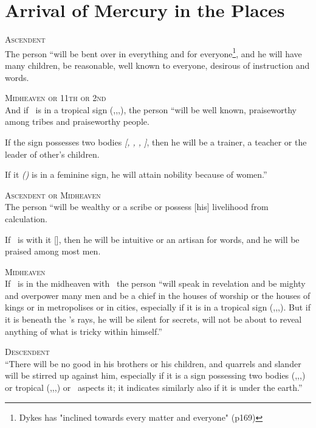 \section{Arrival of Mercury in the Places}

\noindent\textsc{Ascendent} \hfill \\
\indent The person ``will be bent over in  everything and for everyone\footnote{Dykes has "inclined towards every matter and everyone" (p169)}, and he will have many children, be reasonable, well known to everyone, desirous of instruction and words.

\noindent\textsc{Midheaven or 11th or 2nd} \hfill \\
\indent And if \Mercury\, is in a tropical sign (\Aries,\Cancer,\Libra,\Capricorn), the person ``will be well known, praiseworthy among tribes and praiseworthy people. 

If the sign possesses two bodies \textsl{[\Gemini, \Virgo, \Sagittarius, \Pisces]}, then he will be a trainer, a teacher or the leader of other's children.

If it \textsl{(\Mercury)} is in a feminine sign, he will attain nobility because of women.''

\noindent\textsc{Ascendent or Midheaven} \hfill \\
\indent The person ``will be wealthy or a scribe or possess [his] livelihood from calculation.

If \Venus\, is with it [\Mercury], then he will be intuitive or an artisan for words, and he will be praised among most men.

\noindent\textsc{Midheaven} \hfill \\
If \Mercury\, is in the midheaven with \Jupiter\, the person ``will speak in revelation and be mighty and overpower many men and be a chief in the houses of worship or the houses of kings or in metropolises or in cities, especially if it is in a tropical sign (\Aries,\Cancer,\Libra,\Capricorn). But if it is beneath the \Sun's rays, he will be silent for secrets, will not be about to reveal anything of what is tricky within himself.''

\noindent\textsc{Descendent} \hfill \\
\indent ``There will be no good in his brothers or his children, and quarrels and slander will be stirred up against him, especially if it is a sign possessing two bodies (\Gemini,\Virgo,\Sagittarius,\Pisces) or tropical (\Aries,\Cancer,\Libra,\Capricorn) or \Mars\, aspects it; it indicates similarly also if it is under the earth.''

